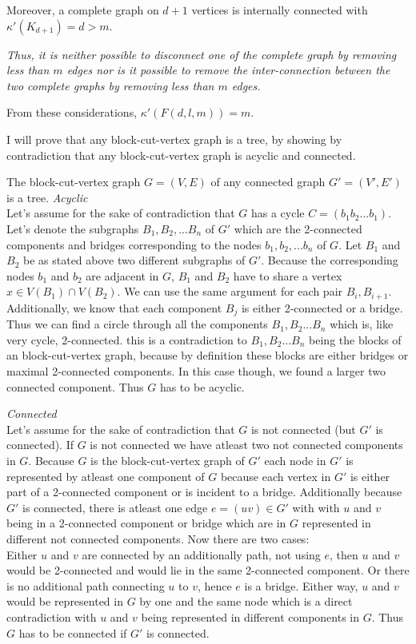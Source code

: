 \documentclass[a4paper]{article}
\begin{document}
\begin{solution}{14}
		Moreover, a complete graph on $d+1$ vertices is internally connected with $\kappa'(K_{d+1}) = d > m$.

		\emph{Thus, it is neither possible to disconnect one of the complete graph by removing less than $m$ edges nor is it possible to remove the inter-connection between the two complete graphs by removing less than $m$ edges.}

		From these considerations, $\kappa'(F(d,l,m)) = m$.
	\end{solution}
	\newpage
	\begin{solution}{15}
		I will prove that any block-cut-vertex graph is a tree, by showing by contradiction that any block-cut-vertex graph is acyclic and connected. 
	\begin{theorem}{The block-cut-vertex graph $G=(V,E)$ of any connected graph $G'=(V',E')$ is a tree.}
		\emph{Acyclic}\\
		Let's assume for the sake of contradiction that $G$ has a cycle $C=(b_1b_2...b_1)$.
		Let's denote the subgraphs $B_1,B_2,...B_n$ of $G'$ which are the 2-connected components and bridges corresponding to the nodes $b_1,b_2,...b_n$ of $G$. 
		Let $B_1$ and $B_2$ be as stated above two different subgraphs of $G'$. 
		Because the corresponding nodes $b_1$ and $b_2$ are adjacent in $G$, $B_1$ and $B_2$ have to share a vertex $x \in V(B_1) \cap V(B_2)$. 
		We can use the same argument for each pair $B_i, B_{i+1}$. 
		Additionally, we know that each component $B_j$ is either 2-connected or a bridge. 
		Thus we can find a circle through all the components $B_1, B_2...B_n$ which is, like very cycle, 2-connected.
		this is a contradiction to $B_1, B_2...B_n$ being the blocks of an block-cut-vertex graph, because by definition these blocks are either bridges or maximal 2-connected components. 
		In this case though, we found a larger two connected component. 
		Thus $G$ has to be acyclic. 
		
		\emph{Connected}\\
		Let's assume for the sake of contradiction that $G$ is not connected (but $G'$ is connected). 
		If $G$ is not connected we have atleast two not connected components in $G$. 
		Because $G$ is the block-cut-vertex graph of $G'$ each node in $G'$ is represented by atleast one component of $G$ because each vertex in $G'$ is either part of a 2-connected component or is incident to a bridge. 
		Additionally because $G'$ is connected, there is atleast one edge $e=(uv) \in G'$ with with $u$ and $v$ being in a 2-connected component or bridge which are in $G$ represented in different not connected components. 
		Now there are two cases:\\
		Either $u$ and $v$ are connected by an additionally path, not using $e$, then $u$ and $v$ would be 2-connected and would lie in the same 2-connected component. 
		Or there is no additional path connecting $u$ to $v$, hence $e$ is a bridge. 
		Either way, $u$ and $v$ would be represented in $G$ by one and the same node which is a direct contradiction with $u$ and $v$ being represented in different components in $G$. 
		Thus $G$ has to be connected if $G'$ is connected.  
	\end{theorem}
	\end{solution}
	\newpage
	\begin{solution}{16}
	\end{solution}
	
\end{document}
